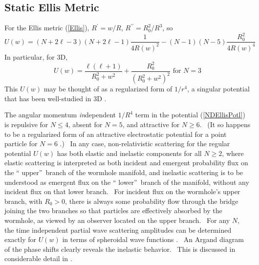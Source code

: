 \documentclass{article}%
\begin{document}
\subsection{Static Ellis Metric}

For the Ellis metric (\ref{Ellis}), $R^{\prime}=w/R$, $R^{\prime\prime}%
=R_{0}^{2}/R^{3}$, so%
\begin{equation}
U\left(  w\right)  =\left(  N+2\ell-3\right)  \left(  N+2\ell-1\right)
\frac{1}{4R\left(  w\right)  ^{2}}-\left(  N-1\right)  \left(  N-5\right)
\frac{R_{0}^{2}}{4R\left(  w\right)  ^{4}} \label{NDEllisPotl}%
\end{equation}
In particular, for 3D,%
\begin{equation}
U\left(  w\right)  =\frac{\ell\left(  \ell+1\right)  }{R_{0}^{2}+w^{2}}%
+\frac{R_{0}^{2}}{\left(  R_{0}^{2}+w^{2}\right)  ^{2}}\text{ \ \ for \ \ }N=3
\label{3DEllisPotl}%
\end{equation}
This $U\left(  w\right)  $ may be thought of as a regularized form of
$1/r^{4}$, a singular potential that has been well-studied in 3D
\cite{Singular1950,Singular1971}.

The angular momentum \emph{in}dependent $1/R^{4}$ term in the potential
(\ref{NDEllisPotl}) is repulsive for $N\leq4$, absent for $N=5$, and
attractive for $N\geq6$. \ (It so happens to be a regularized form of an
attractive electrostatic potential for a point particle for $N=6$
\cite{Green,C et al.}.) \ In any case, non-relativistic scattering for the
regular potential $U\left(  w\right)  $ has both elastic and inelastic
components for all $N\geq2 $, where elastic scattering is interpreted as both
incident and emergent probability flux on the \textquotedblleft
upper\textquotedblright\ branch of the wormhole manifold, and inelastic
scattering is to be understood as emergent flux on the \textquotedblleft
lower\textquotedblright\ branch of the manifold, without any incident flux on
that lower branch. \ For incident flux on the wormhole's upper branch, with
$R_{0}>0$, there is always some probability flow through the bridge joining
the two branches so that particles are effectively absorbed by the wormhole,
as viewed by an observer located on the upper branch. \ For any $N$, the time
independent partial wave scattering amplitudes can be determined exactly for
$U\left(  w\right)  $ in terms of spheroidal wave functions \cite{DLMF}. \ An
Argand diagram of the phase shifts clearly reveals the inelastic behavior.
\ This is discussed in considerable detail in \cite{CS}.
\end{document}
